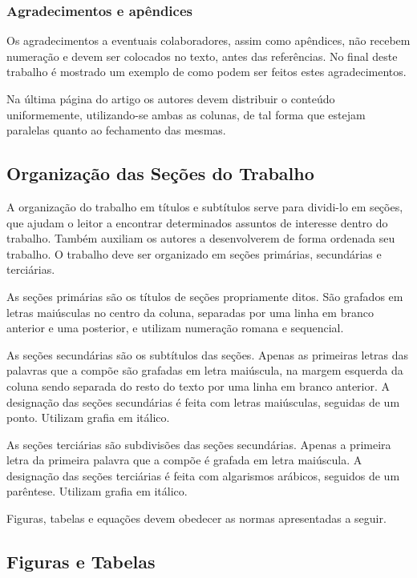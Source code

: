 \vspace*{-0.1mm}
\subsubsection{Agradecimentos e apêndices} 
Os agradecimentos a eventuais colaboradores, assim como apêndices, não recebem numeração e devem ser colocados no texto, antes das referências.  No final deste trabalho  é mostrado um exemplo de como podem ser feitos estes agradecimentos.

Na última página do artigo os autores devem distribuir o conteúdo uniformemente, utilizando-se ambas as colunas, de tal forma que estejam paralelas quanto ao fechamento das mesmas.

\subsection{Organização das Seções do Trabalho}

A organização do trabalho em títulos e subtítulos serve para dividi-lo em seções, que ajudam o leitor a encontrar determinados assuntos de interesse dentro do trabalho. Também auxiliam os autores a desenvolverem de forma ordenada seu trabalho. O trabalho deve ser organizado em seções primárias, secundárias e terciárias.

As seções primárias são os títulos de seções propriamente ditos. São grafados em letras maiúsculas no centro da coluna, separadas por uma linha em branco anterior e uma posterior, e utilizam numeração romana e sequencial.

As seções secundárias são os subtítulos das seções. Apenas as primeiras letras das palavras que a compõe são grafadas em letra maiúscula, na margem esquerda da coluna sendo separada do resto do texto por uma linha em branco anterior. A designação das seções secundárias é feita com letras maiúsculas, seguidas de um ponto. Utilizam grafia em itálico.

As seções terciárias são subdivisões das seções secundárias. Apenas a primeira letra da primeira palavra que a compõe é grafada em letra maiúscula. A designação das seções terciárias é feita com algarismos arábicos, seguidos de um parêntese. Utilizam grafia em itálico.



Figuras, tabelas e equações devem obedecer as normas apresentadas a seguir.

\subsection{Figuras e Tabelas}

